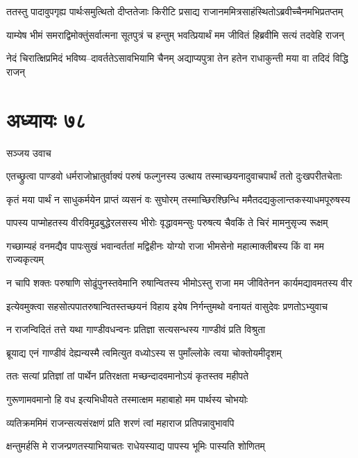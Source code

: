 \twolineshloka
{ततस्तु पादावुपगृह्य पार्थःसमुत्थितो दीप्ततेजाः किरीटि}
{प्रसाद्य राजानममित्रसाहंस्थितोऽब्रवीच्चैनमभिप्रतप्तम्}


\twolineshloka
{याम्येष भीमं समराद्विमोक्तुंसर्वात्मना सूतपुत्रं च हन्तुम्}
{भवत्प्रियार्थं मम जीवितं हिब्रवीमि सत्यं तदवेहि राजन्}


\twolineshloka
{नेदं चिरात्क्षिप्रमिदं भविष्य--दावर्ततेऽसावभियामि चैनम्}
{अद्याप्यपुत्रा तेन हतेन राधाकुन्ती मया वा तदिदं विद्धि राजन्}


\chapter{अध्यायः ७८}
\twolineshloka
{सञ्जय उवाच}
{}


\twolineshloka
{एतच्छ्रुत्वा पाण्डवो धर्मराजोभ्रातुर्वाक्यं परुषं फल्गुनस्य}
{उत्थाय तस्माच्छयनादुवाचपार्थं ततो दुःखपरीतचेताः}


\twolineshloka
{कृतं मया पार्थं न साधुकर्मयेन प्राप्तं व्यसनं वः सुघोरम्}
{तस्माच्छिरश्छिन्धि ममैतदद्यकुलान्तकस्याधमपूरुषस्य}


\twolineshloka
{पापस्य पाप्मोहतस्य वीरविमूढबुद्धेरलसस्य भीरोः}
{वृद्धावमन्सुः परुषत्य चैवकिं ते चिरं मामनुसृज्य रूक्षम्}


\twolineshloka
{गच्छाम्यहं वनमद्यैव पापःसुखं भवान्वर्ततां मद्विहीनः}
{योग्यो राजा भीमसेनो महात्माक्लीबस्य किं वा मम राज्यकृत्यम्}


\twolineshloka
{न चापि शक्तः परुषाणि सोढुंपुनस्तवेमानि रुषान्वितस्य}
{भीमोऽस्तु राजा मम जीवितेनन कार्यमद्यावमतस्य वीर}


\twolineshloka
{इत्येवमुक्त्वा सहसोत्पपातरुषान्वितस्तच्छयनं विहाय}
{इयेष निर्गन्तुमथो वनायतं वासुदेवः प्रणतोऽभ्युवाच}


\twolineshloka
{न राजन्विदितं तत्ते यथा गाण्डीवधन्वनः}
{प्रतिज्ञा सत्यसन्धस्य गाण्डीवं प्रति विश्रुता}


\twolineshloka
{ब्रूयाद्य एनं गाण्डीवं देह्यन्यस्मै त्वमित्युत}
{वध्योऽस्य स पुमाँल्लोके त्वया चोक्तोयमीदृशम्}


\twolineshloka
{ततः सत्यां प्रतिज्ञां तां पार्थेन प्रतिरक्षता}
{मच्छन्दादवमानोऽयं कृतस्तव महीपते}


\twolineshloka
{गुरूणामवमानो हि वध इत्यभिधीयते}
{तस्मात्क्षम महाबाहो मम पार्थस्य चोभयोः}


\twolineshloka
{व्यतिक्रममिमं राजन्सत्यसंरक्षणं प्रति}
{शरणं त्वां महाराज प्रतिपन्नावुभावपि}


\twolineshloka
{क्षन्तुमर्हसि मे राजन्प्रणतस्याभियाचतः}
{राधेयस्याद्य पापस्य भूमिः पास्यति शोणितम्}


